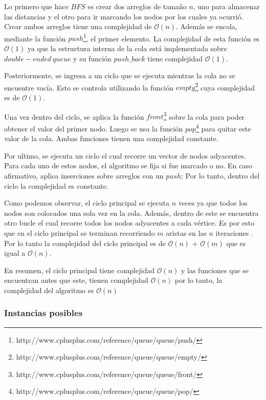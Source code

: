 Lo primero que hace $BFS$ es crear dos arreglos de tamaño $n$, uno para almacenar las distancias y el otro para ir marcando los nodos por los cuales ya ocurrió. Crear ambos arreglos tiene una complejidad de $\mathcal{O}(n)$. Además se encola, mediante la función $push$\footnote{http://www.cplusplus.com/reference/queue/queue/push/}, el primer elemento. La complejidad de esta función es $\mathcal{O}(1)$ ya que la estructura interna de la cola está implementada sobre $double-ended\ queue$ y su función $push\_back$ tiene complejidad $\mathcal{O}(1)$.
\newline

Posteriormente, se ingresa a un ciclo que se ejecuta mientras la cola no se encuentre vacía. Esto se controla utilizando la función $empty$\footnote{http://www.cplusplus.com/reference/queue/queue/empty/} cuya complejidad es de $\mathcal{O}(1)$.
\newline

Una vez dentro del ciclo, se aplica la función $front$\footnote{http://www.cplusplus.com/reference/queue/queue/front/} sobre la cola para poder obtener el valor del primer nodo. Luego se usa la función $pop$\footnote{http://www.cplusplus.com/reference/queue/queue/pop/} para quitar este valor de la cola. Ambas funciones tienen una complejidad constante. \newline

Por ultimo, se ejecuta un ciclo el cual recorre un vector de nodos adyacentes. Para cada uno de estos nodos, el algoritmo se fija si fue marcado o no. En caso afirmativo, aplica inserciones sobre arreglos con un $push$; Por lo tanto, dentro del ciclo la complejidad es constante.

Como podemos observar, el ciclo principal se ejecuta $n$ veces ya que todos los nodos son colocados una sola vez en la cola. Además, dentro de este se encuentra otro bucle el cual recorre todos los nodos adyacentes a cada vértice. Es por esto que en el ciclo principal se terminan recorriendo $m$ aristas en las $n$ iteraciones . Por lo tanto la complejidad del ciclo principal es de $\mathcal{O}(n)$ + $\mathcal{O}(m)$ que es igual a $\mathcal{O}(n)$.
\newline

En resumen, el ciclo principal tiene complejidad $\mathcal{O}(n)$ y las funciones que se encuentran antes que este, tienen complejidad $\mathcal{O}(n)$ por lo tanto, la complejidad del algoritmo es $\mathcal{O}(n)$

\subsubsection{Instancias posibles}

